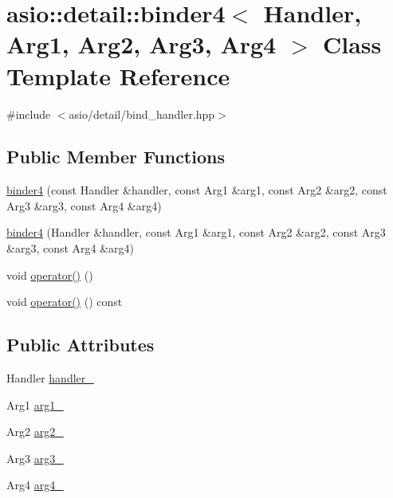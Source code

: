 \hypertarget{classasio_1_1detail_1_1binder4}{}\section{asio\+:\+:detail\+:\+:binder4$<$ Handler, Arg1, Arg2, Arg3, Arg4 $>$ Class Template Reference}
\label{classasio_1_1detail_1_1binder4}


{\ttfamily \#include $<$asio/detail/bind\+\_\+handler.\+hpp$>$}

\subsection*{Public Member Functions}
\begin{DoxyCompactItemize}
\item 
\hyperlink{classasio_1_1detail_1_1binder4_ab970007fd3a9915eb2ff06f7971984f2}{binder4} (const Handler \&handler, const Arg1 \&arg1, const Arg2 \&arg2, const Arg3 \&arg3, const Arg4 \&arg4)
\item 
\hyperlink{classasio_1_1detail_1_1binder4_a00dd61e785ccb0d27bccc5fcc02a7619}{binder4} (Handler \&handler, const Arg1 \&arg1, const Arg2 \&arg2, const Arg3 \&arg3, const Arg4 \&arg4)
\item 
void \hyperlink{classasio_1_1detail_1_1binder4_abaef796ff72735dadbc651795054eac0}{operator()} ()
\item 
void \hyperlink{classasio_1_1detail_1_1binder4_a5d26c3d1e59ac38ce4fe056f2d48969a}{operator()} () const 
\end{DoxyCompactItemize}
\subsection*{Public Attributes}
\begin{DoxyCompactItemize}
\item 
Handler \hyperlink{classasio_1_1detail_1_1binder4_a444a6e0eaaef64627f3de2afda54f35e}{handler\+\_\+}
\item 
Arg1 \hyperlink{classasio_1_1detail_1_1binder4_a7f3b6da29e094c1516c28552c32bd86c}{arg1\+\_\+}
\item 
Arg2 \hyperlink{classasio_1_1detail_1_1binder4_a365e0712430a4dbfaf5dbe92fcb5728e}{arg2\+\_\+}
\item 
Arg3 \hyperlink{classasio_1_1detail_1_1binder4_ac5ae387da705816089fd2e47c35f862a}{arg3\+\_\+}
\item 
Arg4 \hyperlink{classasio_1_1detail_1_1binder4_abfeeba0018be820726c0273129bdcfa3}{arg4\+\_\+}
\end{DoxyCompactItemize}


